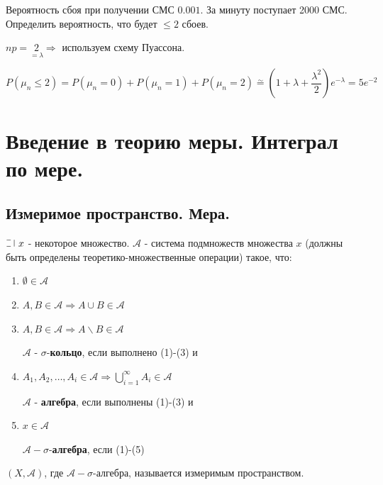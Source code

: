 \begin{exmp}
	Вероятность сбоя при получении СМС $0.001$. За минуту поступает 2000 СМС. Определить вероятность, что будет $\le2$ сбоев.
	
	$np = \underset{=\lambda}{2} \Rightarrow$ используем схему Пуассона.
	
	\[ P(\mu_n \le 2) = P(\mu_n = 0) + P(\mu_n = 1) + P(\mu_n = 2) \stackrel{\sim}{=} \left(1 + \lambda + \dfrac{\lambda^2}{2}\right) e^{- \lambda} = 5e^{-2} \]
\end{exmp}

\section{Введение в теорию меры. Интеграл по мере.}

\subsection{Измеримое пространство. Мера.}

\begin{definition}
	$\letus ~ x$ - некоторое множество. $\mathcal{A}$ - система подмножеств множества $x$ (должны быть определены теоретико-множественные операции) такое, что:
	\begin{enumerate}
		
		$\mathcal{A}$ - \textbf{кольцо}, если:
		
		\item $\emptyset \in \mathcal{A}$
		\item $A,B \in \mathcal{A} \Rightarrow A \cup B \in \mathcal{A}$
		\item $A,B \in \mathcal{A} \Rightarrow A \backslash B \in \mathcal{A}$
		
		$\mathcal{A}$ - $\mathbf{\mathit{\sigma}}$-\textbf{кольцо}, если выполнено (1)-(3) и
		
		\item $A_1,A_2,\dots,A_i\in \mathcal{A} \Rightarrow \bigcup\limits_{i=1}^{\infty} A_i \in \mathcal{A}$
		
		$\mathcal{A}$ - \textbf{алгебра}, если выполнены (1)-(3) и
		
		\item $x \in \mathcal{A}$
		
		$\mathcal{A}-\mathbf{\mathit{\sigma}}$-\textbf{алгебра}, если (1)-(5)
	\end{enumerate}
\end{definition}

\begin{definition}
	$(X, \mathcal{A})$, где $\mathcal{A} - \sigma$-алгебра, называется измеримым пространством.
\end{definition}


